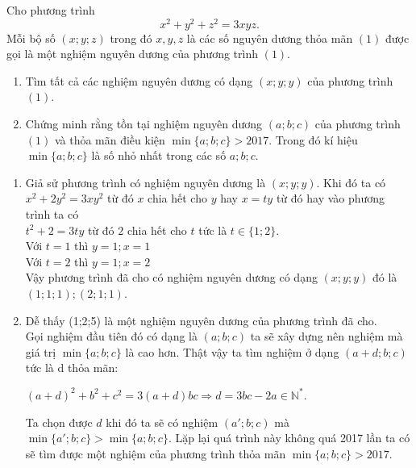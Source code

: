 \begin{bt}%
Cho phương trình 
\[x^2+y^2+z^2=3xyz.\tag{1}\]
Mỗi bộ số $(x;y;z) $ trong đó $x,y,z$ là các số nguyên dương thỏa mãn $(1)$ được gọi là một nghiệm nguyên dương của phương trình $(1)$.
\begin{enumerate}
	\item Tìm tất cả các nghiệm nguyên dương có dạng $(x;y;y)$ của phương trình $(1)$.
	\item Chứng minh rằng tồn tại nghiệm nguyên dương $(a;b;c)$ của phương trình $(1)$ và thỏa mãn điều kiện $\min\{a;b;c\}>2017$. Trong đó kí hiệu $\min\{a;b;c\}$ là số nhỏ nhất trong các số $a;b;c$.
\end{enumerate}
\loigiai
{\begin{enumerate}
		\item Giả sử phương trình có nghiệm nguyên dương là $(x;y;y)$. Khi đó ta có\\
		$ x^2+2y^2=3xy^2$ từ đó $x$ chia hết cho $y$ hay $x=ty$ từ đó hay vào phương trình ta có\\
		$ t^2+2=3ty$ từ đó $2$ chia hết cho $t$ tức là $t\in\{1;2\}$.\\
		Với $t=1$ thì $y=1;x=1$\\
		Với $t=2$ thì $y=1;x=2$\\
		Vậy phương trình đã cho có nghiệm nguyên dương có dạng $(x;y;y) $ đó là $ (1;1;1);(2;1;1)$.
		\item  Dễ thấy (1;2;5) là một nghiệm nguyên dương của phương trình đã cho.\\
		Gọi nghiệm đầu tiên đó có dạng là $(a;b;c)$ ta sẽ xây dựng nên nghiệm mà giá trị $\min\{a;b;c\}$ là cao hơn. Thật vậy ta tìm nghiệm ở dạng $(a+d;b;c)$ tức là d thỏa mãn:
		\begin{center}
			$(a+d)^2+b^2+c^2=3(a+d)bc\Rightarrow d=3bc-2a\in \mathbb{N}^*$.
		\end{center}
		Ta  chọn được $d$ khi đó ta sẽ có nghiệm $(a';b;c)$ mà $\min\{a';b;c\}>\min\{a;b;c\}$. Lặp lại quá trình này không quá 2017 lần ta có sẽ tìm được một nghiệm của phương trình thỏa mãn $\min\{a;b;c\}>2017$.
	\end{enumerate}
}
\end{bt}

